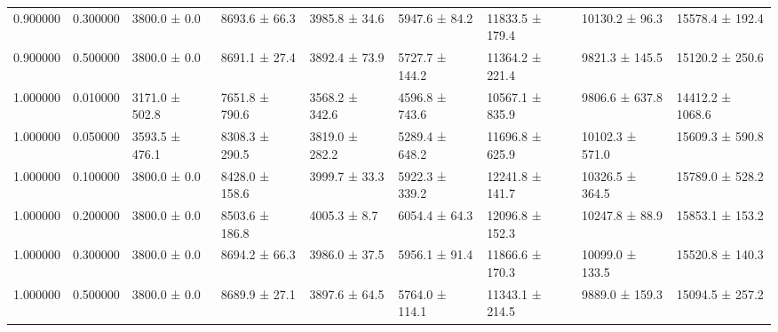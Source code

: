 \begin{table}
\begin{tabular}{rrlllllll}
0.900000 & 0.300000 & 3800.0 ± 0.0 & 8693.6 ± 66.3 & 3985.8 ± 34.6 & 5947.6 ± 84.2 & 11833.5 ± 179.4 & 10130.2 ± 96.3 & 15578.4 ± 192.4 \\
0.900000 & 0.500000 & 3800.0 ± 0.0 & 8691.1 ± 27.4 & 3892.4 ± 73.9 & 5727.7 ± 144.2 & 11364.2 ± 221.4 & 9821.3 ± 145.5 & 15120.2 ± 250.6 \\
1.000000 & 0.010000 & 3171.0 ± 502.8 & 7651.8 ± 790.6 & 3568.2 ± 342.6 & 4596.8 ± 743.6 & 10567.1 ± 835.9 & 9806.6 ± 637.8 & 14412.2 ± 1068.6 \\
1.000000 & 0.050000 & 3593.5 ± 476.1 & 8308.3 ± 290.5 & 3819.0 ± 282.2 & 5289.4 ± 648.2 & 11696.8 ± 625.9 & 10102.3 ± 571.0 & 15609.3 ± 590.8 \\
1.000000 & 0.100000 & 3800.0 ± 0.0 & 8428.0 ± 158.6 & 3999.7 ± 33.3 & 5922.3 ± 339.2 & 12241.8 ± 141.7 & 10326.5 ± 364.5 & 15789.0 ± 528.2 \\
1.000000 & 0.200000 & 3800.0 ± 0.0 & 8503.6 ± 186.8 & 4005.3 ± 8.7 & 6054.4 ± 64.3 & 12096.8 ± 152.3 & 10247.8 ± 88.9 & 15853.1 ± 153.2 \\
1.000000 & 0.300000 & 3800.0 ± 0.0 & 8694.2 ± 66.3 & 3986.0 ± 37.5 & 5956.1 ± 91.4 & 11866.6 ± 170.3 & 10099.0 ± 133.5 & 15520.8 ± 140.3 \\
1.000000 & 0.500000 & 3800.0 ± 0.0 & 8689.9 ± 27.1 & 3897.6 ± 64.5 & 5764.0 ± 114.1 & 11343.1 ± 214.5 & 9889.0 ± 159.3 & 15094.5 ± 257.2 \\
\bottomrule
\end{tabular}
\end{table}

